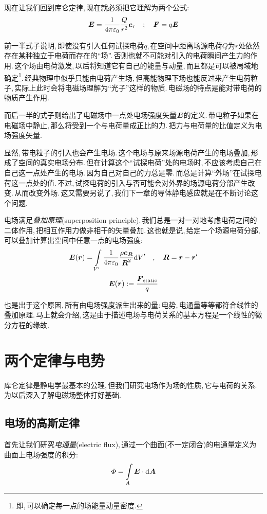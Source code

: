 现在让我们回到库仑定律,\,现在就必须把它理解为两个公式:
\[\boldsymbol{E}=\frac{1}{4\pi\varepsilon_0} \frac{Q}{r^2}\boldsymbol{e}_r\quad ;\quad \boldsymbol{F}=q\boldsymbol{E}\]

前一半式子说明,\,即使没有引入任何试探电荷$q$,\,在空间中距离场源电荷$Q$为$r$处依然存在某种独立于电荷而存在的``场''.\,否则也就不可能对引入的电荷瞬间产生力的作用.\,这个场由电荷激发,\,以后将知道它有自己的能量与动量,\,而且都是可以被局域地确定\footnote{即,\,可以确定每一点的场能量动量密度.}.\,经典物理中似乎只能由电荷产生场,\,但高能物理下场也能反过来产生电荷粒子,\,实际上此时会将电磁场理解为``光子''这样的物质.\,电磁场的特点是能对带电荷的物质产生作用.

而后一半的式子则给出了电磁场中一点处电场强度矢量$\boldsymbol{E}$的定义.\,带电粒子如果在电磁场中静止,\,那么将受到一个与电荷量成正比的力.\,把力与电荷量的比值定义为电场强度矢量.

显然,\,带电粒子的引入也会产生电场.\,这个电场与原来场源电荷产生的电场叠加,\,形成了空间的真实电场分布.\,但在计算这个``试探电荷''处的电场时,\,不应该考虑自己在自己这一点处产生的电场.\,因为自己对自己的力总是零.\,而总是计算``外场''在试探电荷这一点处的值.\,不过,\,试探电荷的引入与否可能会对外界的场源电荷分部产生改变.\,从而改变外场.\,这又需要另说了,\,我们下一章的导体静电感应就是在不断讨论这个问题.

电场满足\emph{叠加原理}(superposition principle).\,我们总是一对一对地考虑电荷之间的二体作用,\,把相互作用力做非相干的矢量叠加.\,这也就是说,\,给定一个场源电荷分部,\,可以叠加计算出空间中任意一点的电场强度:
\[\boldsymbol{E}(\boldsymbol{r})=\int\limits_{V'} \frac{1}{4\pi\varepsilon_0} \frac{\rho \boldsymbol{e}_{\boldsymbol{R}}}{\boldsymbol{R}^2} \textrm{d} V'\quad,\quad \boldsymbol{R}=\boldsymbol{r}-\boldsymbol{r}'\]
\[\boldsymbol{E}(\boldsymbol{r}):=\frac{\boldsymbol{F}_{\rm static}}{q}\]

也是出于这个原因,\,所有由电场强度派生出来的量:\,电势,\,电通量等等都符合线性的叠加原理.\,马上就会介绍,\,这是由于描述电场与电荷关系的基本方程是一个线性的微分方程的缘故.




\section{两个定律与电势}

库仑定律是静电学最基本的公理,\,但我们研究电场作为场的性质,\,它与电荷的关系.\,为以后深入了解电磁场整体打好基础.

\subsection{电场的高斯定律}

首先让我们研究\emph{电通量}(electric flux),\,通过一个曲面(不一定闭合)的电通量定义为曲面上电场强度的积分:
\[\varPhi=\int\limits_A \boldsymbol{E}\cdot\textrm{d} \boldsymbol{A}\]

